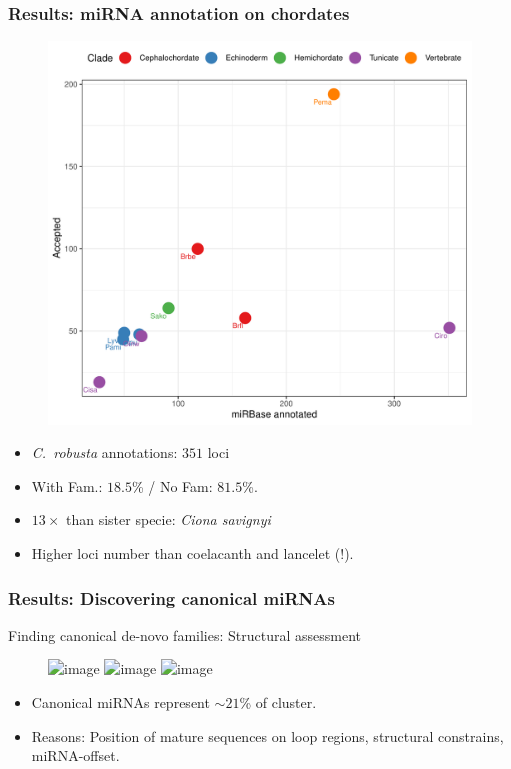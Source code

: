\begin{frame}[t]
    \frametitle{Results: miRNA annotation on chordates}
    \begin{figure}[h!]
        \centering
        \includegraphics[width=.45\linewidth]{Figures/annotated_vs_accepted} %
    \end{figure}
    \begin{itemize}[<+->]
        \item \textit{C.\ robusta} annotations: $351$ loci
        \item With Fam.: $18.5$\% / No Fam: $81.5$\%.
        \item $13\times$ than sister specie: \textit{Ciona savignyi}
        \item Higher loci number than coelacanth and lancelet (!).
    \end{itemize}
\end{frame}

\begin{frame}[t]
    \frametitle{Results: Discovering canonical miRNAs}
    Finding canonical de-novo families: Structural assessment
    \begin{figure}[h!]
        \centering
        \includegraphics<1>[width=\linewidth]{Figures/evaluation_annotation_mirbase1} %
        \includegraphics<2>[width=\linewidth]{Figures/evaluation_annotation_mirbase2} %
        \includegraphics<3>[width=\linewidth]{Figures/mor_example} %
    \end{figure}
     \begin{itemize}[<+->]
         \item Canonical miRNAs represent $\sim21$\% of cluster.
         \item Reasons: Position of mature sequences on loop regions, structural constrains, miRNA-offset.
     \end{itemize}
\end{frame}


